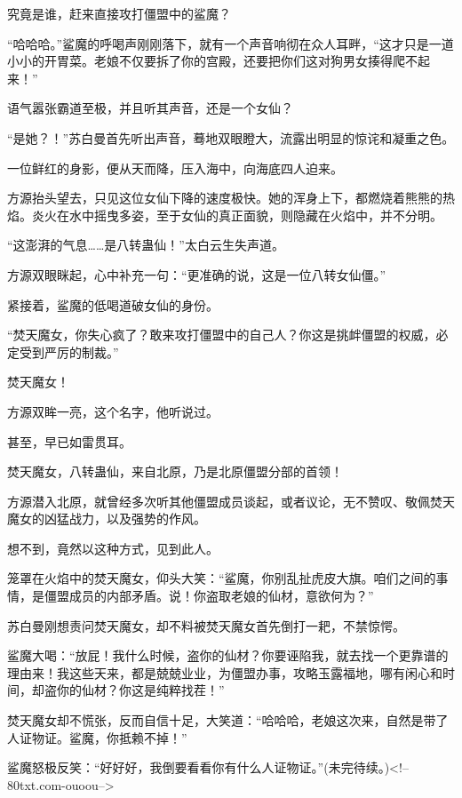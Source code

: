 \begin{this_body}
究竟是谁，赶来直接攻打僵盟中的鲨魔？

“哈哈哈。”鲨魔的呼喝声刚刚落下，就有一个声音响彻在众人耳畔，“这才只是一道小小的开胃菜。老娘不仅要拆了你的宫殿，还要把你们这对狗男女揍得爬不起来！”

语气嚣张霸道至极，并且听其声音，还是一个女仙？

“是她？！”苏白曼首先听出声音，蓦地双眼瞪大，流露出明显的惊诧和凝重之色。

一位鲜红的身影，便从天而降，压入海中，向海底四人迫来。

方源抬头望去，只见这位女仙下降的速度极快。她的浑身上下，都燃烧着熊熊的热焰。炎火在水中摇曳多姿，至于女仙的真正面貌，则隐藏在火焰中，并不分明。

“这澎湃的气息……是八转蛊仙！”太白云生失声道。

方源双眼眯起，心中补充一句：“更准确的说，这是一位八转女仙僵。”

紧接着，鲨魔的低喝道破女仙的身份。

“焚天魔女，你失心疯了？敢来攻打僵盟中的自己人？你这是挑衅僵盟的权威，必定受到严厉的制裁。”

焚天魔女！

方源双眸一亮，这个名字，他听说过。

甚至，早已如雷贯耳。

焚天魔女，八转蛊仙，来自北原，乃是北原僵盟分部的首领！

方源潜入北原，就曾经多次听其他僵盟成员谈起，或者议论，无不赞叹、敬佩焚天魔女的凶猛战力，以及强势的作风。

想不到，竟然以这种方式，见到此人。

笼罩在火焰中的焚天魔女，仰头大笑：“鲨魔，你别乱扯虎皮大旗。咱们之间的事情，是僵盟成员的内部矛盾。说！你盗取老娘的仙材，意欲何为？”

苏白曼刚想责问焚天魔女，却不料被焚天魔女首先倒打一耙，不禁惊愕。

鲨魔大喝：“放屁！我什么时候，盗你的仙材？你要诬陷我，就去找一个更靠谱的理由来！我这些天来，都是兢兢业业，为僵盟办事，攻略玉露福地，哪有闲心和时间，却盗你的仙材？你这是纯粹找茬！”

焚天魔女却不慌张，反而自信十足，大笑道：“哈哈哈，老娘这次来，自然是带了人证物证。鲨魔，你抵赖不掉！”

鲨魔怒极反笑：“好好好，我倒要看看你有什么人证物证。”(未完待续。)<!--80txt.com-ouoou-->

\end{this_body}

